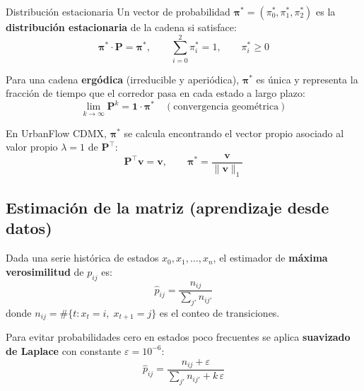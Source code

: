 \documentclass[12pt, a4paper]{article}
\theoremstyle{definition}
\begin{document}
\begin{cajadefinicion}{Distribución estacionaria}
Un vector de probabilidad $\bm{\pi}^* = (\pi^*_0, \pi^*_1, \pi^*_2)$ es
la \textbf{distribución estacionaria} de la cadena si satisface:
\begin{equation}
    \bm{\pi}^* \cdot \mathbf{P} = \bm{\pi}^*, \qquad
    \sum_{i=0}^{2} \pi^*_i = 1, \qquad \pi^*_i \geq 0
    \label{eq:stationary}
\end{equation}
\end{cajadefinicion}

Para una cadena \textbf{ergódica} (irreducible y aperiódica),
$\bm{\pi}^*$ es única y representa la fracción de tiempo que el corredor
pasa en cada estado a largo plazo:
\begin{equation}
    \lim_{k \to \infty} \mathbf{P}^k = \mathbf{1} \cdot \bm{\pi}^*
    \quad (\text{convergencia geométrica})
    \label{eq:ergodic_limit}
\end{equation}

En UrbanFlow CDMX, $\bm{\pi}^*$ se calcula encontrando el vector propio
asociado al valor propio $\lambda = 1$ de $\mathbf{P}^\top$:
\begin{equation}
    \mathbf{P}^\top \bm{v} = \bm{v}, \qquad \bm{\pi}^* = \frac{\bm{v}}{\|\bm{v}\|_1}
    \label{eq:eigenvector}
\end{equation}

\subsection{Estimación de la matriz (aprendizaje desde datos)}

Dada una serie histórica de estados $x_0, x_1, \ldots, x_n$, el estimador
de \textbf{máxima verosimilitud} de $p_{ij}$ es:
\begin{equation}
    \hat{p}_{ij} = \frac{n_{ij}}{\displaystyle\sum_{j'} n_{ij'}}
    \label{eq:mle}
\end{equation}
donde $n_{ij} = \#\{t : x_t = i,\; x_{t+1} = j\}$ es el conteo de transiciones.

Para evitar probabilidades cero en estados poco frecuentes se aplica
\textbf{suavizado de Laplace} con constante $\varepsilon = 10^{-6}$:
\begin{equation}
    \hat{p}_{ij} = \frac{n_{ij} + \varepsilon}
                        {\displaystyle\sum_{j'} n_{ij'} + k\,\varepsilon}
    \label{eq:laplace}
\end{equation}

\end{document}

